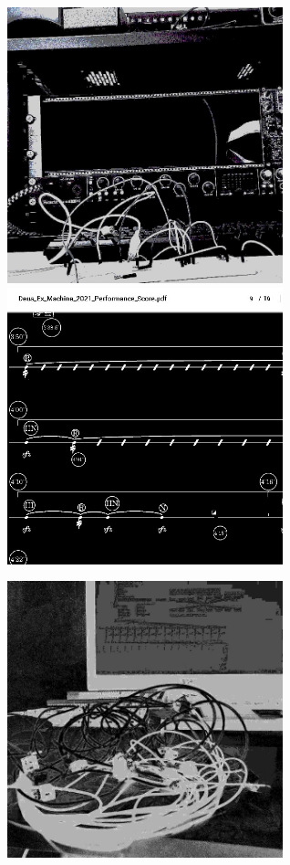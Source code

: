 \documentclass[12pt,landscape]{article}
\begin{document}
{\begin{center}
\begin{figure}[!htb]
\endminipage\hfill
{}%
  \includegraphics[width=8cm]{portfolio3.jpg}

\endminipage\hfill
{}%
  \includegraphics[width=8cm]{portfolio4.jpg}

\endminipage
\end{figure}
\begin{figure}[!htb]
  \includegraphics[width=8cm]{jacks.jpg}


\end{figure}
\end{center}}
\end{document}
